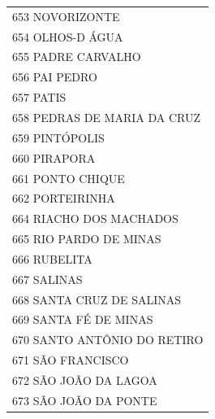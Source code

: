 \documentclass{article}
\begin{document}
\begin{longtable}[c]{m{18cm}}
\multicolumn{1}{l}{ \hspace{2em} 653 NOVORIZONTE } \\
\multicolumn{1}{l}{ \hspace{2em} 654 OLHOS-D ÁGUA } \\
\multicolumn{1}{l}{ \hspace{2em} 655 PADRE CARVALHO } \\
\multicolumn{1}{l}{ \hspace{2em} 656 PAI PEDRO } \\
\multicolumn{1}{l}{ \hspace{2em} 657 PATIS } \\
\multicolumn{1}{l}{ \hspace{2em} 658 PEDRAS DE MARIA DA CRUZ } \\
\multicolumn{1}{l}{ \hspace{2em} 659 PINTÓPOLIS } \\
\multicolumn{1}{l}{ \hspace{2em} 660 PIRAPORA } \\
\multicolumn{1}{l}{ \hspace{2em} 661 PONTO CHIQUE } \\
\multicolumn{1}{l}{ \hspace{2em} 662 PORTEIRINHA } \\
\multicolumn{1}{l}{ \hspace{2em} 664 RIACHO DOS MACHADOS } \\
\multicolumn{1}{l}{ \hspace{2em} 665 RIO PARDO DE MINAS } \\
\multicolumn{1}{l}{ \hspace{2em} 666 RUBELITA } \\
\multicolumn{1}{l}{ \hspace{2em} 667 SALINAS } \\
\multicolumn{1}{l}{ \hspace{2em} 668 SANTA CRUZ DE SALINAS } \\
\multicolumn{1}{l}{ \hspace{2em} 669 SANTA FÉ DE MINAS } \\
\multicolumn{1}{l}{ \hspace{2em} 670 SANTO ANTÔNIO DO RETIRO } \\
\multicolumn{1}{l}{ \hspace{2em} 671 SÃO FRANCISCO } \\
\multicolumn{1}{l}{ \hspace{2em} 672 SÃO JOÃO DA LAGOA } \\
\multicolumn{1}{l}{ \hspace{2em} 673 SÃO JOÃO DA PONTE } \\

\end{longtable}
\end{document}
